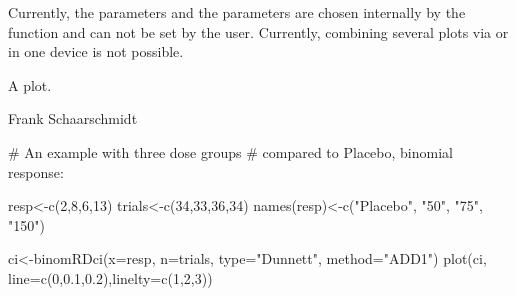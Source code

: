 \begin{Details}\relax
Currently, the  parameters 
and the  parameters  are chosen internally by the function
and can not be set by the user. 
Currently, combining several plots via  or  in one device is not possible.
\end{Details}
\begin{Value}
A plot.
\end{Value}
\begin{Author}\relax
Frank Schaarschmidt
\end{Author}
\begin{References}\relax
\end{References}
\begin{Examples}
\begin{ExampleCode}

# An example with three dose groups
# compared to Placebo, binomial response:

resp<-c(2,8,6,13)
trials<-c(34,33,36,34)
names(resp)<-c("Placebo", "50", "75", "150")

ci<-binomRDci(x=resp, n=trials,
 type="Dunnett", method="ADD1")
plot(ci, line=c(0,0.1,0.2),linelty=c(1,2,3))

\end{ExampleCode}
\end{Examples}

